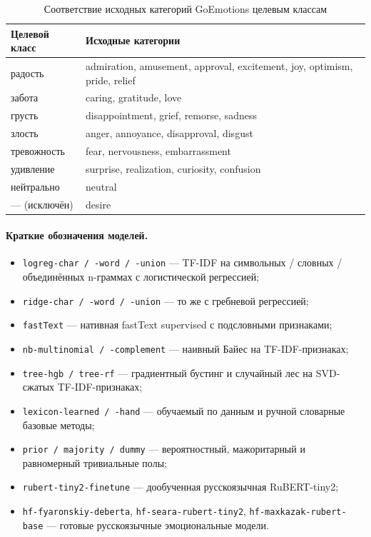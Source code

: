 \documentclass[12pt,a4paper]{report}
\begin{document}
\begin{table}[htbp]
  \caption{Соответствие исходных категорий GoEmotions целевым классам}
  \label{tab:mapping7}
  \centering
  {\small
  \begin{tabular}{|p{3.0cm}|p{10.5cm}|}
    \hline
    \rowcolor{gray!25}
    Целевой класс & Исходные категории \\
    \hline
    радость & admiration, amusement, approval, excitement, joy, optimism, pride, relief \\
    \hline
    забота & caring, gratitude, love \\
    \hline
    грусть & disappointment, grief, remorse, sadness \\
    \hline
    злость & anger, annoyance, disapproval, disgust \\
    \hline
    тревожность & fear, nervousness, embarrassment \\
    \hline
    удивление & surprise, realization, curiosity, confusion \\
    \hline
    нейтрально & neutral \\
    \hline
    --- (исключён) & desire \\
    \hline
  \end{tabular}
  }
\end{table}

\paragraph{Краткие обозначения моделей.}
\begin{itemize}
  \item \texttt{logreg-char / -word / -union} --- TF-IDF на символьных / словных / объединённых n-граммах с логистической регрессией;
  \item \texttt{ridge-char / -word / -union} --- то же с гребневой регрессией;
  \item \texttt{fastText} --- нативная fastText supervised с подсловными признаками;
  \item \texttt{nb-multinomial / -complement} --- наивный Байес на TF-IDF-признаках;
  \item \texttt{tree-hgb / tree-rf} --- градиентный бустинг и случайный лес на SVD-сжатых TF-IDF-признаках;
  \item \texttt{lexicon-learned / -hand} --- обучаемый по данным и ручной словарные базовые методы;
  \item \texttt{prior / majority / dummy} --- вероятностный, мажоритарный и равномерный тривиальные полы;
  \item \texttt{rubert-tiny2-finetune} --- дообученная русскоязычная RuBERT-tiny2;
  \item \texttt{hf-fyaronskiy-deberta}, \texttt{hf-seara-rubert-tiny2}, \texttt{hf-maxkazak-rubert-base} --- готовые русскоязычные эмоциональные модели.
\end{itemize}
\end{document}
